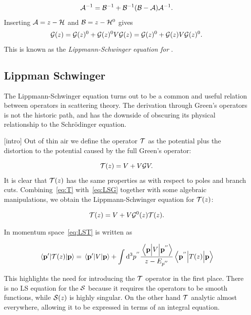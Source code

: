 \begin{equation*}
  \mathcal{A}^{-1} = \mathcal{B}^{-1} + \mathcal{B}^{-1}(\mathcal{B}-\mathcal{A})\mathcal{A}^{-1}.
\end{equation*}
Inserting \(\mathcal{A} = z-\mathcal{H}\) and \(\mathcal{B} = z-\mathcal{H}^{0}\) gives
\begin{equation}
  \label{eq:LSG}
  \mathcal{G}(z) = \mathcal{G}(z){}^{0} + \mathcal{G}(z){}^{0}V\mathcal{G}(z){} = \mathcal{G}(z){}^{0} + \mathcal{G}(z){}V\mathcal{G}(z){}^{0}.
\end{equation}
This is known as the \textit{Lippmann-Schwinger equation for \mgop{}}.


\subsection{Lippman Schwinger}

The Lippmann-Schwinger equation turns out to be a common and useful relation
between operators in scattering theory. The derivation through Green's operators
is not the historic path, and has the downside of obscuring its physical
relationship to the Schr\"odinger equation.

[intro]
Out of thin air we define the operator \(\mathcal{T}\) as the potential plus the
distortion to the potential caused by the full Green's operator:

\begin{equation}
  \label{eq:T}
  \mathcal{T}(z) = V + V\mathcal{G}V.
\end{equation}
It is clear that \(\mathcal{T}(z)\) has the same properties as \mgop{} with respect
to poles and branch cuts. Combining~\eqref{eq:T} with~\eqref{eq:LSG} together
with some algebraic manipulations, we obtain the Lippmann-Schwinger equation for \(\mathcal{T}(z)\):

\begin{equation}
  \label{eq:LST}
 \mathcal{T}(z) = V + V\mathcal{G}^{0}(z)\mathcal{T}(z).
\end{equation}

In momentum space~\eqref{eq:LST} is written as

\begin{equation*}
  \mel{\vb{p}^{\prime}}{\mathcal{T}(z)}{\vb{p}} = \mel{\vb{p}^{\prime}}{V}{\vb{p}}
  + \int\dd^{3}p^{''} \frac{\mel{\vb{p}}{V}{\vb{p^{''}}}}{z-E_{p^{''}}}\mel{\vb{p}^{''}}{T(z)}{\vb{p}}
\end{equation*}

This highlights the need for introducing the \(\mathcal{T}\) operator in the first
place. There is no LS equation for the \(\mathcal{S}\) because it requires the
operators to be smooth functions, while \(\mathcal{S}(z)\) is
highly singular. On the other hand \(\mathcal{T}\) analytic almost everywhere,
allowing it to be expressed in terms of an integral equation. 

